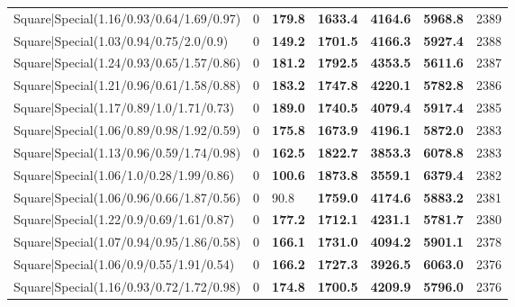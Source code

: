 \begin{tabular}{lrllllr}
 Square|Special(1.16/0.93/0.64/1.69/0.97)                      &             0   & \textbf{179.8} & \textbf{1633.4} & \textbf{4164.6} & \textbf{5968.8} &         2389 \\
 Square|Special(1.03/0.94/0.75/2.0/0.9)                        &             0   & \textbf{149.2} & \textbf{1701.5} & \textbf{4166.3} & \textbf{5927.4} &         2388 \\
 Square|Special(1.24/0.93/0.65/1.57/0.86)                      &             0   & \textbf{181.2} & \textbf{1792.5} & \textbf{4353.5} & \textbf{5611.6} &         2387 \\
 Square|Special(1.21/0.96/0.61/1.58/0.88)                      &             0   & \textbf{183.2} & \textbf{1747.8} & \textbf{4220.1} & \textbf{5782.8} &         2386 \\
 Square|Special(1.17/0.89/1.0/1.71/0.73)                       &             0   & \textbf{189.0} & \textbf{1740.5} & \textbf{4079.4} & \textbf{5917.4} &         2385 \\
 Square|Special(1.06/0.89/0.98/1.92/0.59)                      &             0   & \textbf{175.8} & \textbf{1673.9} & \textbf{4196.1} & \textbf{5872.0} &         2383 \\
 Square|Special(1.13/0.96/0.59/1.74/0.98)                      &             0   & \textbf{162.5} & \textbf{1822.7} & \textbf{3853.3} & \textbf{6078.8} &         2383 \\
 Square|Special(1.06/1.0/0.28/1.99/0.86)                       &             0   & \textbf{100.6} & \textbf{1873.8} & \textbf{3559.1} & \textbf{6379.4} &         2382 \\
 Square|Special(1.06/0.96/0.66/1.87/0.56)                      &             0   & 90.8           & \textbf{1759.0} & \textbf{4174.6} & \textbf{5883.2} &         2381 \\
 Square|Special(1.22/0.9/0.69/1.61/0.87)                       &             0   & \textbf{177.2} & \textbf{1712.1} & \textbf{4231.1} & \textbf{5781.7} &         2380 \\
 Square|Special(1.07/0.94/0.95/1.86/0.58)                      &             0   & \textbf{166.1} & \textbf{1731.0} & \textbf{4094.2} & \textbf{5901.1} &         2378 \\
 Square|Special(1.06/0.9/0.55/1.91/0.54)                       &             0   & \textbf{166.2} & \textbf{1727.3} & \textbf{3926.5} & \textbf{6063.0} &         2376 \\
 Square|Special(1.16/0.93/0.72/1.72/0.98)                      &             0   & \textbf{174.8} & \textbf{1700.5} & \textbf{4209.9} & \textbf{5796.0} &         2376 \\

\end{tabular}
